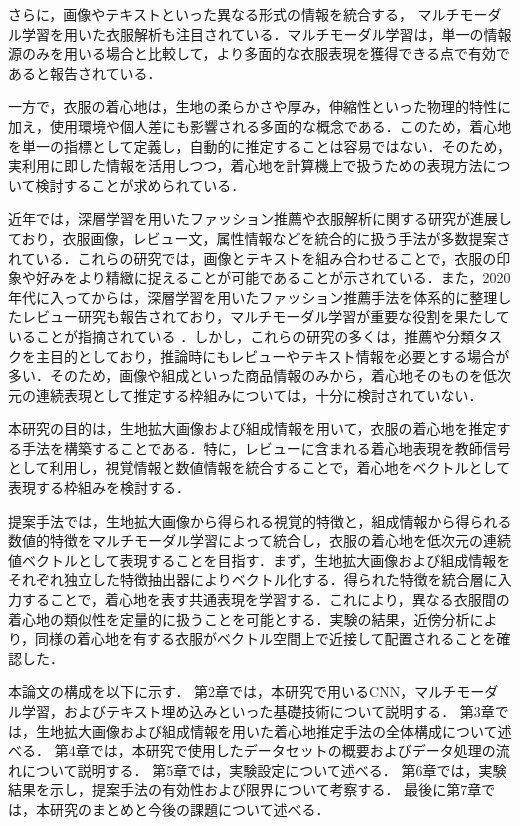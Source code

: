 \documentclass[a4paper,12pt]{jreport}
\begin{document}
さらに，画像やテキストといった異なる形式の情報を統合する，
マルチモーダル学習を用いた衣服解析も注目されている．マルチモーダル学習は，単一の情報源のみを用いる場合と比較して，より多面的な衣服表現を獲得できる点で有効であると報告されている\cite{Ngiam}\cite{Baltrušaitis}\cite{Ni}．

一方で，衣服の着心地は，生地の柔らかさや厚み，伸縮性といった物理的特性に加え，使用環境や個人差にも影響される多面的な概念である．このため，着心地を単一の指標として定義し，自動的に推定することは容易ではない\cite{Norman}．そのため，実利用に即した情報を活用しつつ，着心地を計算機上で扱うための表現方法について検討することが求められている．

近年では，深層学習を用いたファッション推薦や衣服解析に関する研究が進展しており，衣服画像，レビュー文，属性情報などを統合的に扱う手法が多数提案されている．これらの研究では，画像とテキストを組み合わせることで，衣服の印象や好みをより精緻に捉えることが可能であることが示されている\cite{Ni}\cite{McAuley13}\cite{Zheng}．また，2020年代に入ってからは，深層学習を用いたファッション推薦手法を体系的に整理したレビュー研究も報告されており，マルチモーダル学習が重要な役割を果たしていることが指摘されている \cite{LiuQ}\cite{Wu}．しかし，これらの研究の多くは，推薦や分類タスクを主目的としており，推論時にもレビューやテキスト情報を必要とする場合が多い．そのため，画像や組成といった商品情報のみから，着心地そのものを低次元の連続表現として推定する枠組みについては，十分に検討されていない．

本研究の目的は，生地拡大画像および組成情報を用いて，衣服の着心地を推定する手法を構築することである．特に，レビューに含まれる着心地表現を教師信号として利用し，視覚情報と数値情報を統合することで，着心地をベクトルとして表現する枠組みを検討する．

提案手法では，生地拡大画像から得られる視覚的特徴と，組成情報から得られる数値的特徴をマルチモーダル学習によって統合し，衣服の着心地を低次元の連続値ベクトルとして表現することを目指す．まず，生地拡大画像および組成情報をそれぞれ独立した特徴抽出器によりベクトル化する．得られた特徴を統合層に入力することで，着心地を表す共通表現を学習する．これにより，異なる衣服間の着心地の類似性を定量的に扱うことを可能とする．実験の結果，近傍分析により，同様の着心地を有する衣服がベクトル空間上で近接して配置されることを確認した．

本論文の構成を以下に示す．
第2章では，本研究で用いるCNN，マルチモーダル学習，およびテキスト埋め込みといった基礎技術について説明する．
第3章では，生地拡大画像および組成情報を用いた着心地推定手法の全体構成について述べる．
第4章では，本研究で使用したデータセットの概要およびデータ処理の流れについて説明する．
第5章では，実験設定について述べる．
第6章では，実験結果を示し，提案手法の有効性および限界について考察する．
最後に第7章では，本研究のまとめと今後の課題について述べる．
\end{document}
